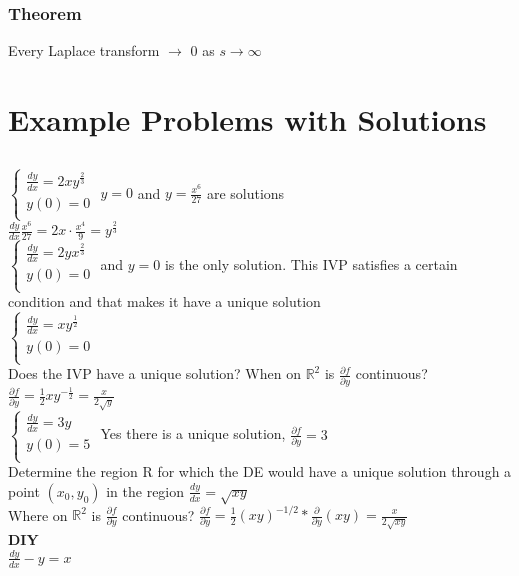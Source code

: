 \documentclass{article}
\begin{document}
\subsubsection{Theorem}
Every Laplace transform $\to$ 0 as $s\to\infty$









\pagebreak
\section{Example Problems with Solutions}
\subsection{}
$\begin{cases}
    \frac{dy}{dx} = 2xy^\frac{2}{3}\\
    y(0) = 0  \\
\end{cases}$
$y=0$ and $y=\frac{x^6}{27}$ are solutions \\[0.05in]$\frac{dy}{dx} \frac{x^6}{27} = 2x \cdot \frac{x^4}{9} = y^\frac{2}{3}$
\\[0.05in]$\begin{cases}
    \frac{dy}{dx} = 2yx^\frac{2}{3}\\
    y(0) = 0  \\[0.05in]
\end{cases}$ and $y=0$ is the only solution. This IVP satisfies a certain condition and that makes it have a unique solution
\\[0.05in]$\begin{cases}
    \frac{dy}{dx} = xy^\frac{1}{2}\\
    y(0) = 0  \\
\end{cases}$
\\ Does the IVP have a unique solution? When on $\mathbb{R}^2$ is $\frac{\partial f}{\partial y}$ continuous? $\frac{\partial f }{ \partial y }= \frac{1}{2} xy^{-\frac{1}{2}} = \frac{x}{2\sqrt{y}}$
\\$\begin{cases}
    \frac{dy}{dx} = 3y\\
    y(0) = 5  \\
\end{cases}$ 
Yes there is a unique solution, $\frac{\partial f}{\partial y} = 3$\\
Determine the region R for which the DE would have a unique solution through a point $(x_0, y_0)$ in the region
$\frac{dy}{dx} = \sqrt{xy}$ \\ Where on $\mathbb{R}^2$ is $\frac{\partial f}{\partial y}$ continuous? $\frac{\partial f}{\partial y} = \frac{1}{2}(xy)^{-1/2} * \frac{\partial}{\partial y} (xy) = \frac{x}{2\sqrt{xy}}$
\\ \textbf{DIY}
\\ $\frac{dy}{dx}-y=x$ 
\end{document}
